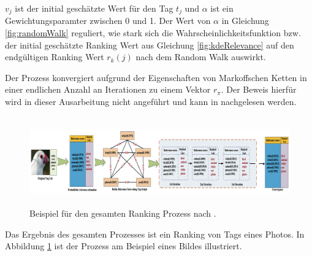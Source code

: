 $v_j$ ist der initial geschätzte Wert für den Tag $t_j$ und $\alpha$ ist ein Gewichtungsparamter zwischen 0 und 1. Der Wert von $\alpha$ in Gleichung \ref{fig:randomWalk} reguliert, wie stark sich die Wahrscheinlichkeitsfunktion bzw. der initial geschätzte Ranking Wert aus Gleichung \ref{fig:kdeRelevance} auf den endgültigen Ranking Wert $r_k(j)$ nach dem Random Walk auswirkt.

Der Prozess konvergiert aufgrund der Eigenschaften von Markoffschen Ketten in einer endlichen Anzahl an Iterationen zu einem Vektor $r_\pi$. Der Beweis hierfür wird in dieser Ausarbeitung nicht angeführt und kann in \cite{ranking} nachgelesen werden.


\begin{figure}[htbp]
  \centering
    \includegraphics[height=1.5in]{images/example_of_random_walk.png}
  \caption{Beispiel für den gesamten Ranking Prozess nach \cite{ranking}.}
  \label{fig:randomWalkExample}
\end{figure}


Das Ergebnis des gesamten Prozesses ist ein Ranking von Tags eines Photos. In Abbildung \ref{fig:randomWalkExample} ist der Prozess am Beispiel eines Bildes illustriert. %





